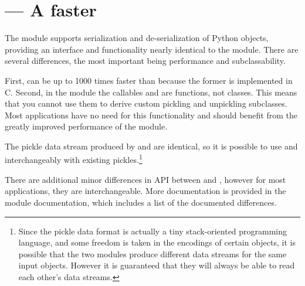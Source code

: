 \section{ --- A faster }


The  module supports serialization and
de-serialization of Python objects, providing an interface and
functionality nearly identical to the
 module.  There are several
differences, the most important being performance and subclassability.

First,  can be up to 1000 times faster than
 because the former is implemented in C.  Second, in
the  module the callables  and
 are functions, not classes.  This means that
you cannot use them to derive custom pickling and unpickling
subclasses.  Most applications have no need for this functionality and
should benefit from the greatly improved performance of the
 module.

The pickle data stream produced by  and
 are identical, so it is possible to use
 and  interchangeably with existing
pickles.\footnote{Since the pickle data format is actually a tiny
stack-oriented programming language, and some freedom is taken in the
encodings of certain objects, it is possible that the two modules
produce different data streams for the same input objects.  However it
is guaranteed that they will always be able to read each other's
data streams.}

There are additional minor differences in API between 
and , however for most applications, they are
interchangeable.  More documentation is provided in the
 module documentation, which
includes a list of the documented differences.


